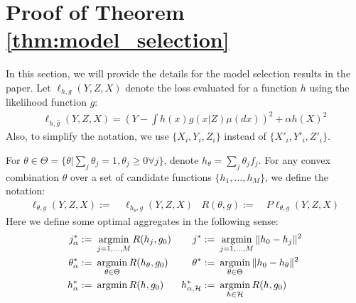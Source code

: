 \section{Proof of Theorem \ref{thm:model_selection}}\label{sec: proof-model-selection}
In this section, we will provide the details for the model selection results in the paper. 
Let $\ell_{h,g}(Y,Z,X)$ denote the loss evaluated for a function $h$ using the likelihood function $\hat{g}$: 
\begin{align*}
    \ell_{h,\hat{g}}(Y,Z,X) ={\left(Y - \int h(x)\hat{g}(x|Z)\mu(dx)\right)^2} + {\alpha h(X)^2}
\end{align*}
Also, to simplify the notation, we use $\{X_i,Y_i,Z_i\}$ instead of  $\{X'_i,Y'_i,Z'_i\}$. 

For $\theta\in\Theta = \{\theta | \sum_j \theta_j = 1, \theta_j\geq 0 \forall j\} $, denote $h_{\theta} = \sum_j \theta_j f_j$. For any convex combination $\theta$ over a set of candidate functions $\{h_1, \ldots, h_M\}$, we define the notation:
\begin{align*}
    \ell_{\theta,g}(Y,Z,X) :=~& \ell_{h_{\theta}, g}(Y,Z,X) &
    R(\theta,g) :=~& P\ell_{\theta,g}(Y,Z,X)
\end{align*}
Here we define some optimal aggregates in the following sense:
\begin{align*}
    j^*_{\alpha} :=~& \mathop{\mathrm{argmin}}_{j = 1, \dots, M}  R(h_{j},g_0) &
    j^* :=~& \mathop{\mathrm{argmin}}_{j = 1, \dots, M} \|h_0 - h_j\|^2\\
    \theta^*_{\alpha} :=~& \mathop{\mathrm{argmin}}_{\theta \in \Theta} R(h_{\theta},g_0) &
    \theta^* :=~& \mathop{\mathrm{argmin}}_{\theta \in \Theta} \|h_0 - h_{\theta}\|^2\\
    h_{\alpha}^* :=~& \mathop{\mathrm{argmin}} R(h,g_0) &
    h_{\alpha, \mathcal{H}}^* :=~& \mathop{\mathrm{argmin}}_{h \in \mathcal{H}} R(h,g_0)
\end{align*}

